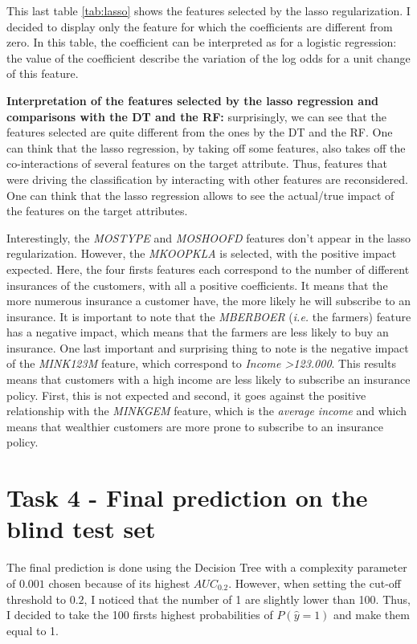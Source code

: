 \documentclass[
  12pt,
  oneside]{report}
\begin{document}
This last table \ref{tab:lasso} shows the features selected by the lasso regularization. I decided to display only the feature for which the coefficients are different from zero. In this table, the coefficient can be interpreted as for a logistic regression: the value of the coefficient describe the variation of the log odds for a unit change of this feature.

\textbf{Interpretation of the features selected by the lasso regression and comparisons with the DT and the RF:} surprisingly, we can see that the features selected are quite different from the ones by the DT and the RF. One can think that the lasso regression, by taking off some features, also takes off the co-interactions of several features on the target attribute. Thus, features that were driving the classification by interacting with other features are reconsidered. One can think that the lasso regression allows to see the actual/true impact of the features on the target attributes.

Interestingly, the \emph{MOSTYPE} and \emph{MOSHOOFD} features don't appear in the lasso regularization. However, the \emph{MKOOPKLA} is selected, with the positive impact expected. Here, the four firsts features each correspond to the number of different insurances of the customers, with all a positive coefficients. It means that the more numerous insurance a customer have, the more likely he will subscribe to an insurance. It is important to note that the \emph{MBERBOER} (\emph{i.e.} the farmers) feature has a negative impact, which means that the farmers are less likely to buy an insurance. One last important and surprising thing to note is the negative impact of the \emph{MINK123M} feature, which correspond to \emph{Income \textgreater123.000}. This results means that customers with a high income are less likely to subscribe an insurance policy. First, this is not expected and second, it goes against the positive relationship with the \emph{MINKGEM} feature, which is the \emph{average income} and which means that wealthier customers are more prone to subscribe to an insurance policy.

\hypertarget{task-4---final-prediction-on-the-blind-test-set}{%
\chapter{Task 4 - Final prediction on the blind test set}\label{task-4---final-prediction-on-the-blind-test-set}}

The final prediction is done using the Decision Tree with a complexity parameter of \(0.001\) chosen because of its highest \(AUC_{0.2}\). However, when setting the cut-off threshold to \(0.2\), I noticed that the number of 1 are slightly lower than 100. Thus, I decided to take the 100 firsts highest probabilities of \(P(\hat{y} = 1)\) and make them equal to 1.
\end{document}
